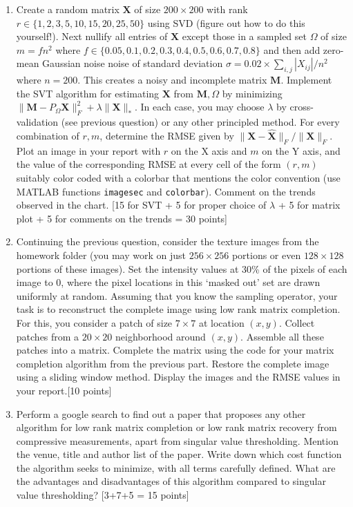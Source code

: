 \documentclass[11pt]{article}
\begin{document}
\begin{enumerate}
\item Create a random matrix $\boldsymbol{X}$ of size $200 \times 200$ with rank $r \in \{1,2,3,5,10,15,20,25,50\}$ using SVD (figure out how to do this yourself!). Next nullify all entries of $\boldsymbol{X}$ except those in a sampled set $\Omega$ of size $m = fn^2$ where $f \in \{0.05,0.1,0.2,0.3,0.4,0.5,0.6,0.7,0.8\}$ and then add zero-mean Gaussian noise noise of standard deviation $\sigma = 0.02 \times \sum_{i,j} |X_{ij}|/n^2$ where $n = 200$. This creates a noisy and incomplete matrix $\boldsymbol{M}$. Implement the SVT algorithm for estimating $\boldsymbol{X}$ from $\boldsymbol{M}, \Omega$ by minimizing $\|\boldsymbol{M}-P_{\Omega}\boldsymbol{X}\|^2_F + \lambda \|\boldsymbol{X}\|_{*}$. In each case, you may choose $\lambda$ by cross-validation (see previous question) or any other principled method. For every combination of $r,m$, determine the RMSE given by $\|\boldsymbol{X}-\boldsymbol{\hat{X}}\|_F/\|\boldsymbol{X}\|_F$. Plot an image in your report with $r$ on the X axis and $m$ on the Y axis, and the value of the corresponding RMSE at every cell of the form $(r,m)$ suitably color coded with a colorbar that mentions the color convention (use MATLAB functions \texttt{imagesec} and \texttt{colorbar}). Comment on the trends observed in the chart. \textsf{[15 for SVT + 5 for proper choice of $\lambda$ + 5 for matrix plot + 5 for comments on the trends = 30 points]} 

\item Continuing the previous question, consider the texture images from the homework folder (you may work on just $256 \times 256$ portions or even $128 \times 128$ portions of these images). Set the intensity values at 30\% of the pixels of each image to 0, where the pixel locations in this `masked out' set are drawn uniformly at random. Assuming that you know the sampling operator, your task is to reconstruct the complete image using low rank matrix completion. For this, you consider a patch of size $7 \times 7$ at location $(x,y)$. Collect patches from a $20 \times 20$ neighborhood around $(x,y)$. Assemble all these patches into a matrix. Complete the matrix using the code for your matrix completion algorithm from the previous part. Restore the complete image using a sliding window method. Display the images and the RMSE values in your report.\textsf{[10 points]}

\item Perform a google search to find out a paper that proposes any other algorithm for low rank matrix completion or low rank matrix recovery from compressive measurements, apart from singular value thresholding. Mention the venue, title and author list of the paper. Write down which cost function the algorithm seeks to minimize, with all terms carefully defined. What are the advantages and disadvantages of this algorithm compared to singular value thresholding? \textsf{[3+7+5 = 15 points]}  


\end{enumerate}
\end{document}
